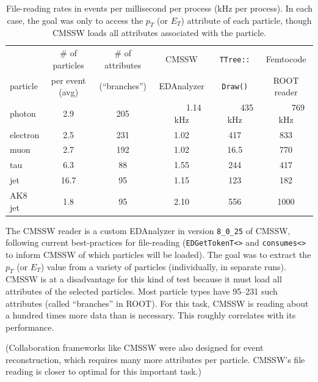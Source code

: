 \documentclass[12pt]{article}
\begin{document}
\begin{table}[t]
\caption{\label{cmssw-table} File-reading rates in events per millisecond per process (kHz per process). In each case, the goal was only to access the $p_T$ (or $E_T$) attribute of each particle, though CMSSW loads all attributes associated with the particle.}

\begin{center}
\begin{tabular}{l c c c c c}
          &\# of particles & \# of attributes & CMSSW &{\tt TTree::} & Femtocode \\
particle  & per event (avg) & (``branches'') & EDAnalyzer &{\tt Draw()} & ROOT reader \\\hline
photon    & 2.9    & 205         & \mbox{\ \ \ \ \ } 1.14 kHz   &   \mbox{\ \ \ \ \ } 435 kHz       &   \mbox{\ \ \ \ \ } 769 kHz \\
electron  & 2.5     & 231         & 1.02   &   417       &   833        \\
muon      & 2.7     & 192         & 1.02   &   16.5      &   770        \\
tau       & 6.3     &  88         & 1.55   &   244       &   417        \\
jet       & 16.7    &  95         & 1.15   &   123       &   182        \\
AK8 jet   & 1.8     &  95         & 2.10   &   556       &   1000       \\
\end{tabular}
\end{center}
\end{table}

The CMSSW reader is a custom EDAnalyzer in version {\tt 8\_0\_25} of CMSSW, following current best-practices for file-reading ({\tt EDGetTokenT<>} and {\tt consumes<>} to inform CMSSW of which particles will be loaded). The goal was to extract the $p_T$ (or $E_T$) value from a variety of particles (individually, in separate runs). CMSSW is at a disadvantage for this kind of test because it must load all attributes of the selected particles. Most particle types have 95--231 such attributes (called ``branches'' in ROOT). For this task, CMSSW is reading about a hundred times more data than is necessary. This roughly correlates with its performance.

(Collaboration frameworks like CMSSW were also designed for event reconstruction, which requires many more attributes per particle. CMSSW's file reading is closer to optimal for this important task.)
\end{document}
